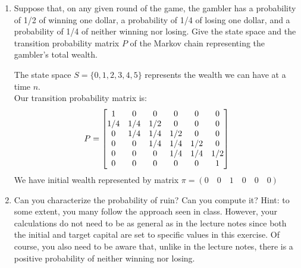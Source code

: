 \documentclass[12pt,twoside, letter]{exam}
\theoremstyle{definition}
\newcommand{\pp}{\mathbb{P}}
\begin{document}
\begin{enumerate}
  \item Suppose that, on any given round of the game, the gambler has a probability of 1/2 of winning one dollar, a probability of
    1/4 of losing one dollar, and a probability of 1/4 of neither winning nor losing. Give the state space and the transition probability matrix $P$ of the
    Markov chain representing the gambler's total wealth.
    \begin{solution}
      The state space $S = \{0, 1, 2, 3, 4, 5\}$ represents the wealth we can have at a time $n$. \\
      Our transition probability matrix is:
      \begin{align*}
        \centering
        P =
          \begin{bmatrix}
            1 & 0 & 0 & 0 & 0 & 0 \\
            1/4 & 1/4 & 1/2 & 0 & 0 & 0 \\
            0 & 1/4 & 1/4 & 1/2 & 0 & 0\\
            0 & 0 & 1/4 & 1/4 & 1/2 & 0 \\
            0 & 0 & 0 & 1/4 & 1/4 & 1/2 \\
            0 & 0 & 0 & 0 & 0 & 1
          \end{bmatrix}
      \end{align*}
      We have initial wealth represented by matrix $\pi = (0 \quad 0 \quad 1 \quad 0 \quad 0  \quad 0)$
    \end{solution}
  \item Can you characterize the probability of ruin? Can you compute it? Hint: to some extent, you many follow the approach seen in class. However, your calculations do not need to be
    as general as in the lecture notes since both the initial and target capital are set to specific values in this exercise. Of course, you also need to be aware that, unlike
    in the lecture notes, there is a positive probability of neither winning nor losing.
\end{enumerate}
\end{document}
